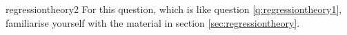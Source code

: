 \begin{answer}{regressiontheory2}
For this question, which is like question \ref{q:regressiontheory1}, familiarise yourself with the material in section \ref{sec:regressiontheory}.
\end{answer}
